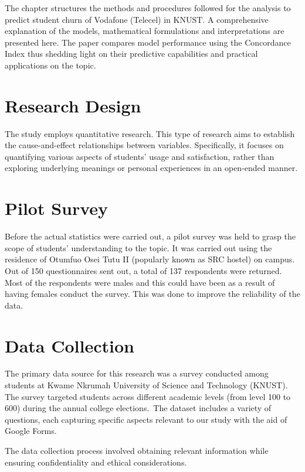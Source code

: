 \documentclass[12pt]{report}
\begin{document}
	The chapter structures the methods and procedures followed for the analysis to predict student churn of Vodafone (Telecel) in KNUST. A comprehensive explanation of the models, mathematical formulations and interpretations are presented here. The paper compares model performance using the Concordance Index thus shedding light on their predictive capabilities and practical applications on the topic.
	
	\section{Research Design}
	
	The study employs quantitative research. This type of research aims to establish the cause-and-effect relationships between variables. Specifically, it focuses on quantifying various aspects of students’ usage and satisfaction, rather than exploring underlying meanings or personal experiences in an open-ended manner.
	
	\section{Pilot Survey}
	
	Before the actual statistics were carried out, a pilot survey was held to grasp the scope of students’ understanding to the topic. It was carried out using the residence of Otumfuo Osei Tutu II (popularly known as SRC hostel) on campus. Out of 150 questionnaires sent out, a total of 137 respondents were returned. Most of the respondents were males and this could have been as a result of having females conduct the survey. This was done to improve the reliability of the data.
	
	\section{Data Collection}
	
	The primary data source for this research was a survey conducted among students at Kwame Nkrumah University of Science and Technology (KNUST). The survey targeted students across different academic levels (from level 100 to 600) during the annual college elections. The dataset includes a variety of questions, each capturing specific aspects relevant to our study with the aid of Google Forms.
	
	The data collection process involved obtaining relevant information while ensuring confidentiality and ethical considerations.
	
\end{document}
